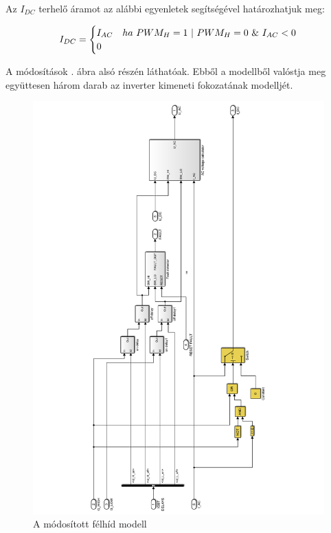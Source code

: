 Az $I_{DC}$ terhelő áramot az alábbi egyenletek segítségével határozhatjuk meg:

\begin{equation}
\centering
I_{DC}
=
\begin{cases}
I_{AC}   & ha \  PWM_H = 1 \  | \  PWM_H = 0 \  \& \  I_{AC} < 0 \\
0 & 
\end{cases}   
\end{equation}

A módosítások . ábra alsó részén láthatóak. Ebből a modellből valóstja meg együttesen három darab az inverter kimeneti fokozatának modelljét. 

\begin{figure}[]
	\centering
	\includegraphics[width = \textwidth]{figures/igbt_model.pdf}
	\caption{A módosított félhíd modell} 
	\label{fig:igbt_model}
\end{figure}




